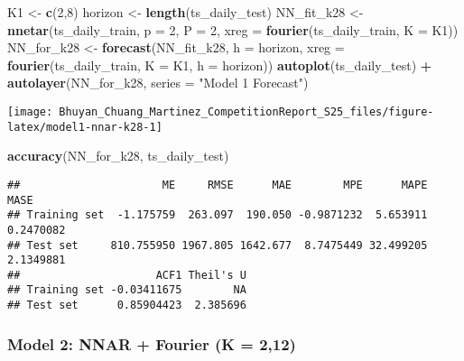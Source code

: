 \documentclass[
]{article}
\newenvironment{Shaded}{\begin{snugshade}}{\end{snugshade}}
\newcommand{\AttributeTok}[1]{\textcolor[rgb]{0.13,0.29,0.53}{#1}}
\newcommand{\DecValTok}[1]{\textcolor[rgb]{0.00,0.00,0.81}{#1}}
\newcommand{\FunctionTok}[1]{\textcolor[rgb]{0.13,0.29,0.53}{\textbf{#1}}}
\newcommand{\NormalTok}[1]{#1}
\newcommand{\OtherTok}[1]{\textcolor[rgb]{0.56,0.35,0.01}{#1}}
\newcommand{\SpecialCharTok}[1]{\textcolor[rgb]{0.81,0.36,0.00}{\textbf{#1}}}
\newcommand{\StringTok}[1]{\textcolor[rgb]{0.31,0.60,0.02}{#1}}
\begin{document}
\begin{Shaded}
\begin{Highlighting}[]
\NormalTok{K1 }\OtherTok{\textless{}{-}} \FunctionTok{c}\NormalTok{(}\DecValTok{2}\NormalTok{,}\DecValTok{8}\NormalTok{)}
\NormalTok{horizon }\OtherTok{\textless{}{-}} \FunctionTok{length}\NormalTok{(ts\_daily\_test)}
\NormalTok{NN\_fit\_k28 }\OtherTok{\textless{}{-}} \FunctionTok{nnetar}\NormalTok{(ts\_daily\_train, }\AttributeTok{p =} \DecValTok{2}\NormalTok{, }\AttributeTok{P =} \DecValTok{2}\NormalTok{, }\AttributeTok{xreg =} \FunctionTok{fourier}\NormalTok{(ts\_daily\_train, }\AttributeTok{K =}\NormalTok{ K1))}
\NormalTok{NN\_for\_k28 }\OtherTok{\textless{}{-}} \FunctionTok{forecast}\NormalTok{(NN\_fit\_k28, }\AttributeTok{h =}\NormalTok{ horizon, }\AttributeTok{xreg =} \FunctionTok{fourier}\NormalTok{(ts\_daily\_train, }\AttributeTok{K =}\NormalTok{ K1, }\AttributeTok{h =}\NormalTok{ horizon))}
\FunctionTok{autoplot}\NormalTok{(ts\_daily\_test) }\SpecialCharTok{+} \FunctionTok{autolayer}\NormalTok{(NN\_for\_k28, }\AttributeTok{series =} \StringTok{"Model 1 Forecast"}\NormalTok{)}
\end{Highlighting}
\end{Shaded}

\begin{center}\texttt{[image: Bhuyan\_Chuang\_Martinez\_CompetitionReport\_S25\_files/figure-latex/model1-nnar-k28-1]} \end{center}

\begin{Shaded}
\begin{Highlighting}[]
\FunctionTok{accuracy}\NormalTok{(NN\_for\_k28, ts\_daily\_test)}
\end{Highlighting}
\end{Shaded}

\begin{verbatim}
##                      ME     RMSE      MAE        MPE      MAPE      MASE
## Training set  -1.175759  263.097  190.050 -0.9871232  5.653911 0.2470082
## Test set     810.755950 1967.805 1642.677  8.7475449 32.499205 2.1349881
##                     ACF1 Theil's U
## Training set -0.03411675        NA
## Test set      0.85904423  2.385696
\end{verbatim}

\subsubsection{Model 2: NNAR + Fourier (K =
2,12)}\label{model-2-nnar-fourier-k-212}
\end{document}
